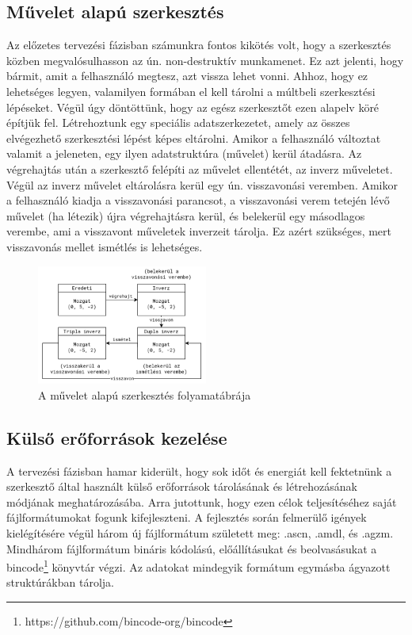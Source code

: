 \pagebreak

\subsection{Művelet alapú szerkesztés}

Az előzetes tervezési fázisban számunkra fontos kikötés volt, hogy a szerkesztés közben
megvalósulhasson az ún. non-destruktív munkamenet. Ez azt jelenti, hogy bármit, amit a felhasználó
megtesz, azt vissza lehet vonni. Ahhoz, hogy ez lehetséges legyen, valamilyen formában el kell
tárolni a múltbeli szerkesztési lépéseket. Végül úgy döntöttünk, hogy az egész szerkesztőt ezen
alapelv köré építjük fel. Létrehoztunk egy speciális adatszerkezetet, amely az összes elvégezhető
szerkesztési lépést képes eltárolni. Amikor a felhasználó változtat valamit a jeleneten, egy
ilyen adatstruktúra (művelet) kerül átadásra. Az végrehajtás után a szerkesztő felépíti az művelet
ellentétét, az inverz műveletet. Végül az inverz művelet eltárolásra kerül egy ún. visszavonási
veremben. Amikor a felhasználó kiadja a visszavonási parancsot, a visszavonási verem tetején lévő
művelet (ha létezik) újra végrehajtásra kerül, és belekerül egy másodlagos verembe, ami a visszavont
műveletek inverzeit tárolja. Ez azért szükséges, mert visszavonás mellet ismétlés is lehetséges.

\begin{figure}[h]
      \centering
      \includegraphics[width=0.5\textwidth]{parts/developer-documentation/editor/images/actions.png}
      \caption{A művelet alapú szerkesztés folyamatábrája}
\end{figure}

\subsection{Külső erőforrások kezelése}

A tervezési fázisban hamar kiderült, hogy sok időt és energiát kell fektetnünk a szerkesztő által
használt külső erőforrások tárolásának és létrehozásának módjának meghatározásába. Arra jutottunk,
hogy ezen célok teljesítéséhez saját fájlformátumokat fogunk kifejleszteni. A fejlesztés során
felmerülő igények kielégítésére végül három új fájlformátum született meg: .ascn, .amdl, és .agzm.
Mindhárom fájlformátum bináris kódolású, előállításukat és beolvasásukat a
bincode\footnote{https://github.com/bincode-org/bincode}
könyvtár végzi. Az adatokat mindegyik formátum egymásba ágyazott struktúrákban tárolja.

